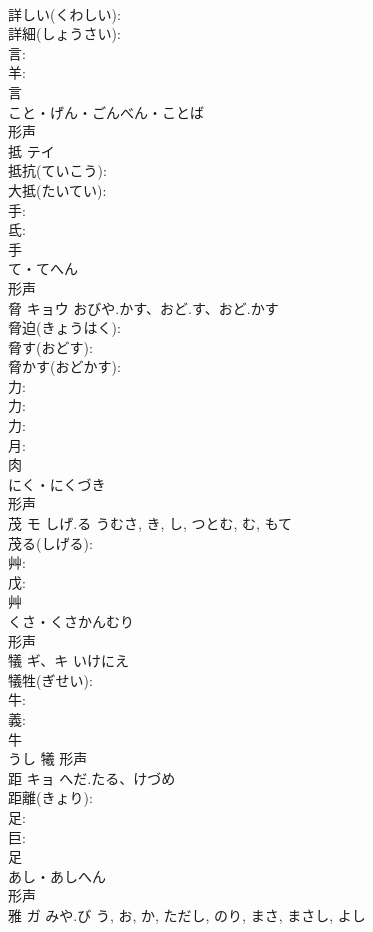 \documentclass[8pt]{extreport}
\begin{document}
\begin{CJK}{UTF8}{min}
\\	詳しい(くわしい): 
\\	詳細(しょうさい): 
\\	言: 
\\	羊: 
\\	言	
\\	こと・げん・ごんべん・ことば	
\\	形声 
\\	抵	テイ			
\\	抵抗(ていこう): 
\\	大抵(たいてい): 
\\	手: 
\\	氐: 
\\	手	
\\	て・てへん	
\\	形声 
\\	脅	キョウ	おびや.かす、おど.す、おど.かす		
\\	脅迫(きょうはく): 
\\	脅す(おどす): 
\\	脅かす(おどかす): 
\\	力: 
\\	力: 
\\	力: 
\\	月: 
\\	肉	
\\	にく・にくづき	
\\	形声 
\\	茂	モ	しげ.る	うむさ, き, し, つとむ, む, もて	
\\	茂る(しげる): 
\\	艸: 
\\	戊: 
\\	艸	
\\	くさ・くさかんむり	
\\	形声 
\\	犠	ギ、キ	いけにえ		
\\	犠牲(ぎせい): 
\\	牛: 
\\	義: 
\\	牛	
\\	うし	犧	形声 
\\	距	キョ	へだ.たる、けづめ		
\\	距離(きょり): 
\\	足: 
\\	巨: 
\\	足	
\\	あし・あしへん	
\\	形声 
\\	雅	ガ	みや.び	う, お, か, ただし, のり, まさ, まさし, よし	

\end{CJK}
\end{document}
